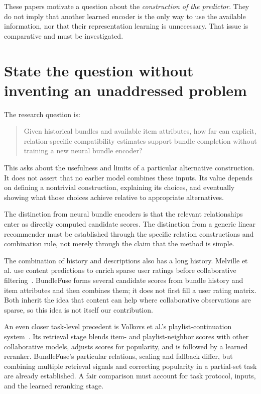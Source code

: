 \documentclass[11pt,a4paper]{article}
\begin{document}
These papers motivate a question about the \emph{construction of the predictor}.
They do not imply that another learned encoder is the only way to use the available
information, nor that their representation learning is unnecessary. That issue is
comparative and must be investigated.

\section{State the question without inventing an unaddressed problem}
The research question is:
\begin{quote}
Given historical bundles and available item attributes, how far can explicit,
relation-specific compatibility estimates support bundle completion without training
a new neural bundle encoder?
\end{quote}
This asks about the usefulness and limits of a particular alternative construction.
It does not assert that no earlier model combines these inputs. Its value depends
on defining a nontrivial construction, explaining its choices, and eventually
showing what those choices achieve relative to appropriate alternatives.

The distinction from neural bundle encoders is that the relevant relationships enter
as directly computed candidate scores. The distinction from a generic linear
recommender must be established through the specific relation constructions and
combination rule, not merely through the claim that the method is simple.

The combination of history and descriptions also has a long history. Melville
et al. use content predictions to enrich sparse user ratings before collaborative
filtering~\cite{melville}. BundleFuse forms several candidate scores from bundle
history and item attributes and then combines them; it does not first fill a user
rating matrix. Both inherit the idea that content can help where collaborative
observations are sparse, so this idea is not itself our contribution.

An even closer task-level precedent is Volkovs et al.'s playlist-continuation
system~\cite{volkovs}. Its retrieval stage blends item- and playlist-neighbor
scores with other collaborative models, adjusts scores for popularity, and is
followed by a learned reranker. BundleFuse's particular relations, scaling and
fallback differ, but combining multiple retrieval signals and correcting
popularity in a partial-set task are already established. A fair comparison must
account for task protocol, inputs, and the learned reranking stage.
\end{document}
